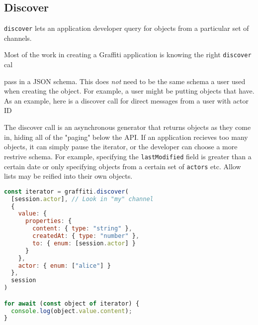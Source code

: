 
\subsection{Discover}

\texttt{discover} lets an application developer query for objects
from a particular set of channels.


Most of the work in creating a Graffiti application is knowing the
right \texttt{discover} cal

pass in a JSON schema. This does \emph{not} need to be the same schema a user
used when creating the object. For example, a user might be putting objects that
have.
As an example, here is a discover call for direct messages from
a user with actor ID

The discover call is an asynchronous generator that returns objects as they come in,
hiding all of the "paging" below the API.
If an application recieves too many objects, it can simply pause the iterator,
or the developer can choose a more restrive schema. For example,
specifying the \texttt{lastModified} field is greater than a certain date or
only specifying objects from a certain set of \texttt{actors} etc.
Allow lists may be reified into their own objects.

\begin{lstlisting}[language=javascript]
const iterator = graffiti.discover(
  [session.actor], // Look in "my" channel
  {
    value: {
      properties: {
        content: { type: "string" },
        createdAt: { type: "number" },
        to: { enum: [session.actor] }
      }
    },
    actor: { enum: ["alice"] }
  },
  session
)

for await (const object of iterator) {
  console.log(object.value.content);
}
\end{lstlisting}

